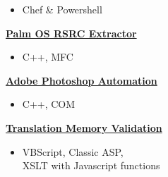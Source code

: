 {\begin{itemize}[noitemsep,topsep=-10pt]
  \item Chef \& Powershell \\
\end{itemize}
\textbf{\href{http://johnpaulnewman.com/projects/palm-os-rsrc-extractor/}{Palm OS RSRC Extractor}}
\begin{itemize}[noitemsep,topsep=-10pt]
  \item C++, MFC \\
\end{itemize}
\textbf{\href{http://johnpaulnewman.com/projects/adobe-photoshop-automation/}{Adobe Photoshop Automation}}
\begin{itemize}[noitemsep,topsep=-10pt]
  \item C++, COM \\
\end{itemize}
\textbf{\href{http://johnpaulnewman.com/projects/translation-memory-validation/}{Translation Memory Validation}}
\begin{itemize}[noitemsep,topsep=-10pt]
  \item VBScript, Classic ASP, \\XSLT with Javascript functions \\
\end{itemize}
}
